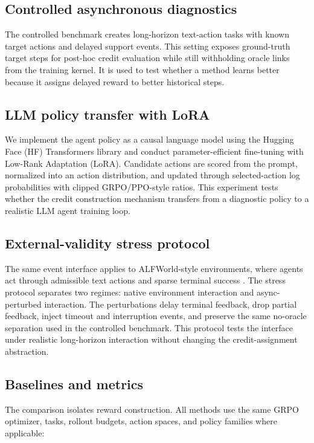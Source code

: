 \documentclass[letterpaper]{article} %
\begin{document}
\subsection{Controlled asynchronous diagnostics}

The controlled benchmark creates long-horizon text-action tasks with known target actions and delayed support events. This setting exposes ground-truth target steps for post-hoc credit evaluation while still withholding oracle links from the training kernel. It is used to test whether a method learns better because it assigns delayed reward to better historical steps.

\subsection{LLM policy transfer with LoRA}

We implement the agent policy as a causal language model using the Hugging Face (HF) Transformers library and conduct parameter-efficient fine-tuning with Low-Rank Adaptation (LoRA). Candidate actions are scored from the prompt, normalized into an action distribution, and updated through selected-action log probabilities with clipped GRPO/PPO-style ratios. This experiment tests whether the credit construction mechanism transfers from a diagnostic policy to a realistic LLM agent training loop.

\subsection{External-validity stress protocol}

The same event interface applies to ALFWorld-style environments, where agents act through admissible text actions and sparse terminal success \citep{shridhar2020alfworld}. The stress protocol separates two regimes: native environment interaction and async-perturbed interaction. The perturbations delay terminal feedback, drop partial feedback, inject timeout and interruption events, and preserve the same no-oracle separation used in the controlled benchmark. This protocol tests the interface under realistic long-horizon interaction without changing the credit-assignment abstraction.

\subsection{Baselines and metrics}

The comparison isolates reward construction. All methods use the same GRPO optimizer, tasks, rollout budgets, action spaces, and policy families where applicable:
\end{document}

